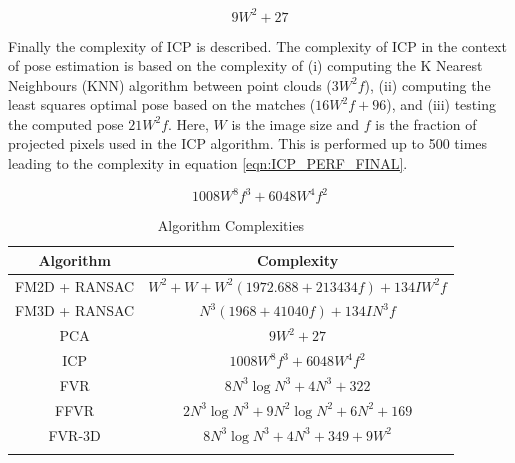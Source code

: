 \begin{equation} \label{eqn:PCA_PERF_FINAL}
9W^2 + 27
\end{equation}

Finally the complexity of ICP is described. The complexity of ICP in the context of pose estimation is based on the complexity of (i) computing the K Nearest Neighbours (KNN) algorithm between point clouds ($3W^2f$), (ii) computing the least squares optimal pose based on the matches ($16W^2f + 96$), and (iii) testing the computed pose $21W^2f$. Here, $W$ is the image size and $f$ is the fraction of projected pixels used in the ICP algorithm. This is performed up to 500 times leading to the complexity in equation \ref{eqn:ICP_PERF_FINAL}.

\begin{equation} \label{eqn:ICP_PERF_FINAL}
1008W^8f^3 + 6048W^4f^2
\end{equation}

\begin{table}[!t]
\centering
\caption{Algorithm Complexities}
\begin{tabular}{cc}\hline
\textbf{Algorithm} & \textbf{Complexity}\\ \hline
FM2D + RANSAC & $W^2 + W + W^2(1972.688 + 213434f) + 134IW^2f$\\
FM3D + RANSAC & $N^3(1968 + 41040f) + 134IN^3f$\\
PCA & $9W^2 + 27$\\
ICP & $1008W^8f^3 + 6048W^4f^2$\\
FVR & $8N^3\log{N^3} + 4N^3 + 322$\\
FFVR & $2N^3\log{N^3} + 9N^2\log{N^2} + 6N^2 + 169$\\
FVR-3D & $8N^3\log{N^3} + 4N^3 + 349 + 9W^2$\\
\\
\end{tabular}
\\[10pt]
\label{table:ALG_COMPLEX_TBL}
\end{table}

